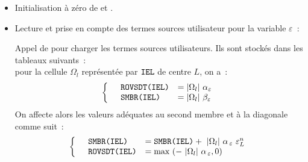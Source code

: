\begin{itemize}
\item Initialisation à zéro de  et .

\item{Lecture et prise en compte des termes sources utilisateur pour la variable $\varepsilon$~:}

Appel de  pour charger les termes sources utilisateurs. Ils sont
stockés dans les tableaux suivants~:\\
pour la cellule $\Omega_l$ représentée par $\text{\texttt{IEL}}$ de centre $L$, on a~:
\begin{equation}\notag
\left\{\begin{array}{lll}
&\text{\texttt{ROVSDT(IEL)}}&= |\Omega_l| \ \alpha_{\varepsilon}\\
&\text{\texttt{SMBR(IEL)}}&=|\Omega_l| \ \beta_{\varepsilon}\\
\end{array}\right.
\end{equation}
On affecte alors les valeurs adéquates au second membre  et à la
diagonale  comme suit~:
\begin{equation}\notag
\left\{\begin{array}{lll}
&\var{SMBR(IEL)} &= \var{SMBR(IEL)} +\ |\Omega_l| \ \alpha_{\,\varepsilon} \
\varepsilon^n_L \\
&\var{ROVSDT(IEL)}&= \text{max }(-\ |\Omega_l| \ \alpha_{\,\varepsilon},0)\\
\end{array}\right.
\end{equation}


\end{itemize}
